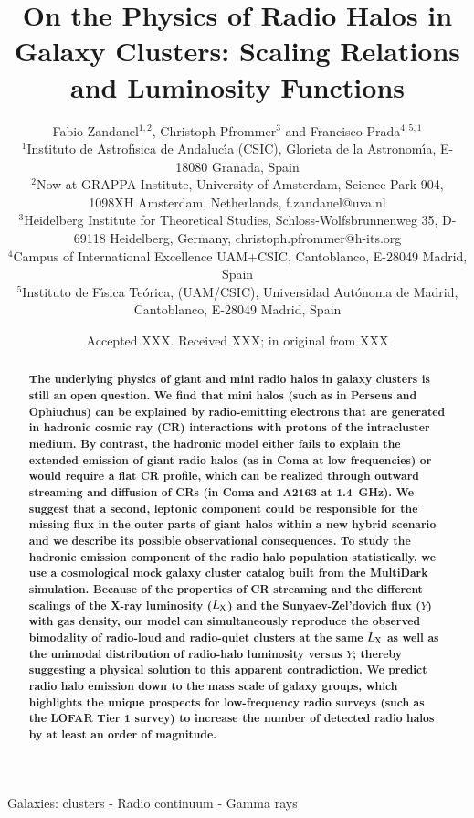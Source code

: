 \documentclass[useAMS,usenatbib]{mn2e}
\title[On the Physics of Radio Halos in Galaxy Clusters]{On the Physics of Radio Halos in Galaxy Clusters: Scaling Relations and Luminosity Functions}
\author[F. Zandanel, C. Pfrommer and F. Prada]{
Fabio Zandanel$^{1,2}$, Christoph Pfrommer$^{3}$ and Francisco Prada$^{4,5,1}$\\
$^{1}$Instituto de Astrof\'{\i}sica de Andaluc\'{\i}a (CSIC), Glorieta de la Astronom\'{\i}a, E-18080 Granada, Spain\\
$^{2}$Now at GRAPPA Institute, University of Amsterdam, Science Park 904, 1098XH Amsterdam, Netherlands, f.zandanel@uva.nl\\
$^{3}$Heidelberg Institute for Theoretical Studies, Schloss-Wolfsbrunnenweg 35, D-69118 Heidelberg, Germany, christoph.pfrommer@h-its.org\\
$^{4}$Campus of International Excellence UAM+CSIC, Cantoblanco, E-28049 Madrid, Spain\\
$^{5}$Instituto de F\'{\i}sica Te\'orica, (UAM/CSIC), Universidad Aut\'onoma de Madrid, Cantoblanco, E-28049 Madrid, Spain}
\begin{document}
\date{Accepted XXX. Received XXX; in original from XXX}

\pagerange{\pageref{firstpage}--\pageref{lastpage}} 

\maketitle

\label{firstpage}

\begin{abstract}
  {\bf The underlying physics of giant and mini radio halos in galaxy clusters
    is still an open question. We find that mini halos (such as in Perseus and
    Ophiuchus) can be explained by radio-emitting electrons that are generated
    in hadronic cosmic ray (CR) interactions with protons of the intracluster
    medium. By contrast, the hadronic model either fails to explain the extended
    emission of giant radio halos (as in Coma at low frequencies) or would
    require a flat CR profile, which can be realized through outward streaming
    and diffusion of CRs (in Coma and A2163 at 1.4~GHz).  We suggest that a
    second, leptonic component could be responsible for the missing flux in the
    outer parts of giant halos within a new hybrid scenario and we describe its
    possible observational consequences.  To study the hadronic emission
    component of the radio halo population statistically, we use a cosmological
    mock galaxy cluster catalog built from the MultiDark simulation. Because of
    the properties of CR streaming and the different scalings of the X-ray
    luminosity ($L_{{\mathrm{X}}}$) and the Sunyaev-Zel'dovich flux ($Y$) with gas
    density, our model can simultaneously reproduce the observed bimodality of
    radio-loud and radio-quiet clusters at the same $L_{{\mathrm{X}}}$ as well as the
    unimodal distribution of radio-halo luminosity versus $Y$; thereby
    suggesting a physical solution to this apparent contradiction. We predict
    radio halo emission down to the mass scale of galaxy groups, which
    highlights the unique prospects for low-frequency radio surveys (such as the
    LOFAR Tier 1 survey) to increase the number of detected radio halos by at
    least an order of magnitude.}
\end{abstract}

\begin{keywords}
  Galaxies: clusters - Radio continuum - Gamma rays
\end{keywords}
\end{document}
